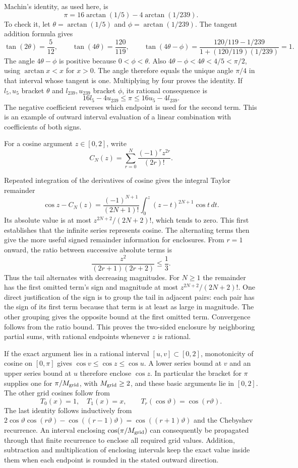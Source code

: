 Machin's identity, as used here, is
\[
 \pi=16\arctan(1/5)-4\arctan(1/239).
\]
To check it, let $\theta=\arctan(1/5)$ and
$\phi=\arctan(1/239)$. The tangent addition formula gives
\[
 \tan(2\theta)=\frac5{12},\qquad
 \tan(4\theta)=\frac{120}{119},\qquad
 \tan(4\theta-\phi)
 =\frac{120/119-1/239}{1+(120/119)(1/239)}=1.
\]
The angle $4\theta-\phi$ is positive because $0<\phi<\theta$.
Also $4\theta-\phi<4\theta<4/5<\pi/2$, using
$\arctan x<x$ for $x>0$. The angle therefore equals the unique
angle $\pi/4$ in that interval whose tangent is one. Multiplying
by four proves the identity. If $l_5,u_5$ bracket $\theta$ and
$l_{239},u_{239}$ bracket $\phi$, its rational consequence is
\[
 16l_5-4u_{239}\leq\pi\leq16u_5-4l_{239}.
\]
The negative coefficient reverses which endpoint is used for the
second term. This is an example of outward interval evaluation of a
linear combination with coefficients of both signs.

For a cosine argument $z\in[0,2]$, write
\[
 C_N(z)=\sum_{r=0}^N\frac{(-1)^r z^{2r}}{(2r)!}.
\]

Repeated integration of the derivatives of cosine gives the integral
Taylor remainder
\[
 \cos z-C_N(z)=\frac{(-1)^{N+1}}{(2N+1)!}
                  \int_0^z(z-t)^{2N+1}\cos t\,dt.
\]
Its absolute value is at most $z^{2N+2}/(2N+2)!$, which tends to
zero. This first establishes that the infinite series represents
cosine. The alternating terms then give the more useful signed
remainder information for enclosures.
From $r=1$ onward, the ratio between successive absolute terms is
\[
 \frac{z^2}{(2r+1)(2r+2)}\leq\frac13.
\]
Thus the tail alternates with decreasing magnitudes. For $N\geq1$
the remainder has the first omitted term's sign and magnitude at
most $z^{2N+2}/(2N+2)!$. One direct justification of the sign is
to group the tail in adjacent pairs: each pair has the sign of its
first term because that term is at least as large in magnitude.
The other grouping gives the opposite bound at the first omitted
term. Convergence follows from the ratio bound. This proves the
two-sided enclosure by neighboring partial sums, with rational
endpoints whenever $z$ is rational.

If the exact argument lies in a rational interval $[u,v]\subset[0,2]$,
monotonicity of cosine on $[0,\pi]$ gives
$\cos v\leq\cos z\leq\cos u$. A lower series bound at $v$
and an upper series bound at $u$ therefore enclose $\cos z$.
In particular the bracket for $\pi$ supplies one for $\pi/M_{\rm grid}$,
with $M_{\rm grid}\geq2$, and these basic arguments lie in $[0,2]$.
The other grid cosines follow from
\[
 T_0(x)=1,\quad T_1(x)=x,\qquad
 T_r(\cos\vartheta)=\cos(r\vartheta).
\]
The last identity follows inductively from
$2\cos\vartheta\cos(r\vartheta)-\cos((r-1)\vartheta)
=\cos((r+1)\vartheta)$ and the Chebyshev recurrence. An interval
enclosing $\cos(\pi/M_{\rm grid})$ can consequently be propagated through
that finite recurrence to enclose all required grid values. Addition,
subtraction and multiplication of enclosing intervals keep the exact
value inside them when each endpoint is rounded in the stated outward
direction.

